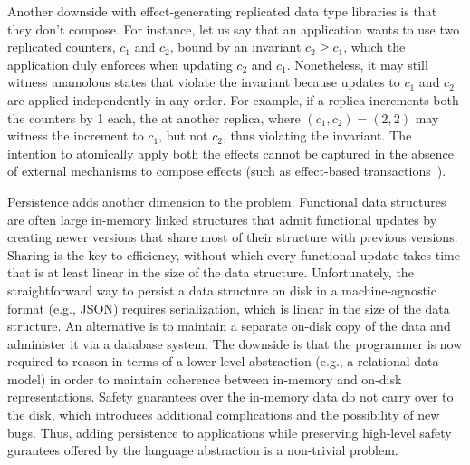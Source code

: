 Another downside with effect-generating replicated data type libraries
is that they don't compose. For instance, let us say that an
application wants to use two replicated counters, $c_1$ and $c_2$,
bound by an invariant $c_2 \ge c_1$, which the application duly
enforces when updating $c_2$ and $c_1$. Nonetheless, it may still
witness anamolous states that violate the invariant because updates to
$c_1$ and $c_2$ are applied independently in any order. For example,
if a replica increments both the counters by 1 each, the  at
another replica, where $(c_1,c_2) = (2,2)$ may witness the increment
to $c_1$, but not $c_2$, thus violating the invariant. The intention
to atomically apply both the effects cannot be captured in the absence
of external mechanisms to compose effects (such as effect-based
transactions~\cite{pldi15}).  

Persistence adds another dimension to the problem. Functional data
structures are often large in-memory linked structures that admit
functional updates by creating newer versions that share most of their
structure with previous versions. Sharing is the key to efficiency,
without which every functional update takes time that is at least
linear in the size of the data structure. Unfortunately, the
straightforward way to persist a data structure on disk in a
machine-agnostic format (e.g., JSON) requires serialization, which is
linear in the size of the data structure. An alternative is to
maintain a separate on-disk copy of the data and administer it via a
database system. The downside is that the programmer is now required
to reason in terms of a lower-level abstraction (e.g., a relational
data model) in order to maintain coherence between in-memory and
on-disk representations. Safety guarantees over the in-memory data do
not carry over to the disk, which introduces additional complications
and the possibility of new bugs. Thus, adding persistence to
applications while preserving high-level safety gurantees offered by
the language abstraction is a non-trivial problem.




